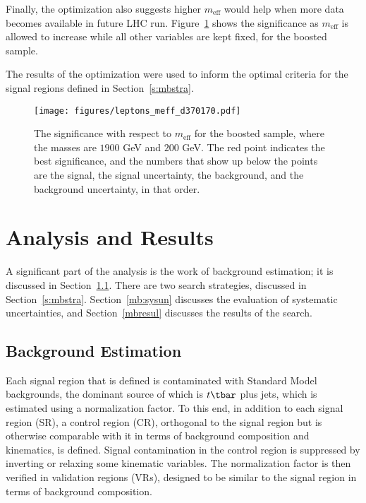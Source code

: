 Finally, the optimization also suggests higher $m_{\text{eff}}$ would help when
more data becomes available in future LHC run. Figure~\ref{f:mbmeffsop} shows
the significance as $m_{\text{eff}}$ is allowed to increase while all other
variables are kept fixed, for the boosted sample.

The results of the optimization were used to inform the optimal criteria for
the signal regions defined in Section~\ref{s:mbstra}.

\begin{figure}[H]
	\texttt{[image: figures/leptons\_meff\_d370170.pdf]}
	\centering

	\caption{The significance with respect to $m_{\text{eff}}$ for the boosted
		sample, where the masses are $1900$ GeV and $200$ GeV. The red point
		indicates the best significance, and the numbers that show up below the
		points are the signal, the signal uncertainty, the background, and the
		background uncertainty, in that order.}

	\label{f:mbmeffsop}
\end{figure}


\section{Analysis and Results}\label{mbbganal}

A significant part of the analysis is the work of background estimation; it is
discussed in Section~\ref{s:mbbg}. There are two search strategies, discussed
in Section~\ref{s:mbstra}. Section~\ref{mb:sysun} discusses the evaluation of
systematic uncertainties, and Section~\ref{mbresul} discusses the results of
the search.

\subsection{Background Estimation}\label{s:mbbg}

Each signal region that is defined is contaminated with Standard Model
backgrounds, the dominant source of which is $t\tbar$ plus jets, which is
estimated using a normalization factor. To this end, in addition to each signal
region (SR), a control region (CR), orthogonal to the signal region but is
otherwise comparable with it in terms of background composition and kinematics,
is defined. Signal contamination in the control region is suppressed by
inverting or relaxing some kinematic variables. The normalization factor is
then verified in validation regions (VRs), designed to be similar to the signal
region in terms of background composition.

